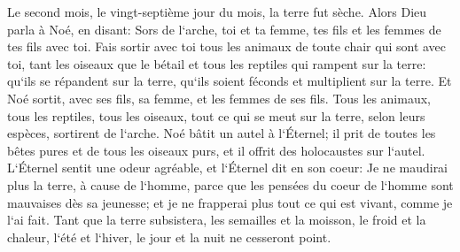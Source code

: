 \verse Le second mois, le vingt-septième jour du mois, la terre fut sèche. 
\verse Alors Dieu parla à Noé, en disant: 
\verse Sors de l`arche, toi et ta femme, tes fils et les femmes de tes fils avec toi. 
\verse Fais sortir avec toi tous les animaux de toute chair qui sont avec toi, tant les oiseaux que le bétail et tous les reptiles qui rampent sur la terre: qu`ils se répandent sur la terre, qu`ils soient féconds et multiplient sur la terre. 
\verse Et Noé sortit, avec ses fils, sa femme, et les femmes de ses fils. 
\verse Tous les animaux, tous les reptiles, tous les oiseaux, tout ce qui se meut sur la terre, selon leurs espèces, sortirent de l`arche. 
\verse Noé bâtit un autel à l`Éternel; il prit de toutes les bêtes pures et de tous les oiseaux purs, et il offrit des holocaustes sur l`autel. 
\verse L`Éternel sentit une odeur agréable, et l`Éternel dit en son coeur: Je ne maudirai plus la terre, à cause de l`homme, parce que les pensées du coeur de l`homme sont mauvaises dès sa jeunesse; et je ne frapperai plus tout ce qui est vivant, comme je l`ai fait. 
\verse Tant que la terre subsistera, les semailles et la moisson, le froid et la chaleur, l`été et l`hiver, le jour et la nuit ne cesseront point. 

